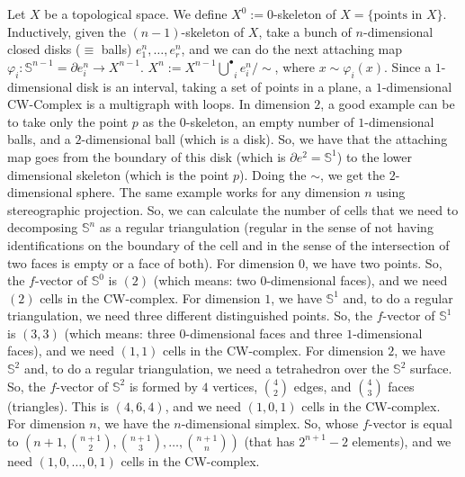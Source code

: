 Let $X$ be a topological space. \newline
We define $X^{0} := 0$-skeleton of $X = \lbrace \text{points in } X \rbrace$. \newline
Inductively, given the $(n-1)$-skeleton of $X$, take a bunch of $n$-dimensional closed disks ($\equiv$ balls) $e_{1}^{n}, \ldots, e_{r}^{n}$, and we can do the next attaching map $\varphi _{i} : \mathbb{S}^{n - 1} = \partial e_{i}^{n} \longrightarrow X^{n - 1}$. \newline
$X^{n} := X^{n-1} \stackrel{\bullet}{\bigcup}_{i} e_{i}^{n} / \sim$, where $x \sim \varphi_{i}(x)$. \newline
Since a $1$-dimensional disk is an interval, taking a set of points in a plane, a $1$-dimensional CW-Complex is a multigraph with loops. \newline
In dimension $2$, a good example can be to take only the point $p$ as the $0$-skeleton, an empty number of $1$-dimensional balls, and a $2$-dimensional ball (which is a disk). So, we have that the attaching map goes from the boundary of this disk (which is $\partial e^{2} = \mathbb{S}^{1}$) to the lower dimensional skeleton (which is the point $p$). Doing the $\sim$, we get the $2$-dimensional sphere. \newline
The same example works for any dimension $n$ using stereographic projection. So, we can calculate the number of cells that we need to decomposing $\mathbb{S}^{n}$ as a regular triangulation (regular in the sense of not having identifications on the boundary of the cell and in the sense of the intersection of two faces is empty or a face of both). \newline
For dimension $0$, we have two points. So, the $f$-vector of $\mathbb{S}^{0}$ is $(2)$ (which means: two $0$-dimensional faces), and we need $(2)$ cells in the CW-complex. \newline
For dimension $1$, we have $\mathbb{S}^{1}$ and, to do a regular triangulation, we need three different distinguished points. So, the $f$-vector of $\mathbb{S}^{1}$ is $(3, 3)$ (which means: three $0$-dimensional faces and three $1$-dimensional faces), and we need $(1, 1)$ cells in the CW-complex. \newline
For dimension $2$, we have $\mathbb{S}^{2}$ and, to do a regular triangulation, we need a tetrahedron over the $\mathbb{S}^{2}$ surface. So, the $f$-vector of $\mathbb{S}^{2}$ is formed by $4$ vertices, $\binom{4}{2}$ edges, and $\binom{4}{3}$ faces (triangles). This is $(4, 6, 4)$, and we need $(1, 0, 1)$ cells in the CW-complex. \newline
For dimension $n$, we have the $n$-dimensional simplex. So, whose $f$-vector is equal to $(n + 1, \binom{n+1}{2}, \binom{n+1}{3}, \ldots, \binom{n+1}{n})$ (that has $2^{n+1}-2$ elements), and we need $(1, 0, \ldots, 0, 1)$ cells in the CW-complex. \newline

